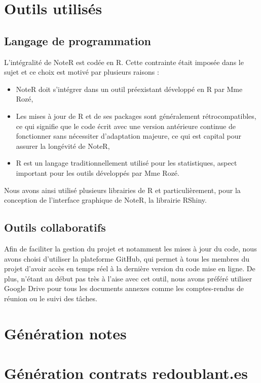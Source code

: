 \documentclass[a4paper,11pt]{article}
\begin{document}
\section{Outils utilisés}
\subsection{Langage de programmation }
    L'intégralité de NoteR est codée en R. Cette contrainte était imposée dans le sujet et ce choix est motivé par plusieurs raisons :
        \begin{itemize}
            \item NoteR doit s'intégrer dans un outil préexistant développé en R par Mme Rozé,
            \item Les mises à jour de R et de ses packages sont généralement rétrocompatibles, ce qui signifie que le code écrit avec une version antérieure continue de fonctionner sans nécessiter d'adaptation majeure, ce qui est capital pour assurer la longévité de NoteR,
            \item  R est un langage traditionnellement utilisé pour les statistiques, aspect important pour les outils développés par Mme Rozé.
        \end{itemize}
        Nous avons ainsi utilisé plusieurs librairies de R et particulièrement, pour la conception de l'interface graphique de NoteR, la librairie RShiny.
\subsection{Outils collaboratifs }
    Afin de faciliter la gestion du projet et notamment les mises à jour du code, nous avons choisi d'utiliser la plateforme GitHub, qui permet à tous les membres du projet d'avoir accès en temps réel à la dernière version du code mise en ligne. De plus, n'étant au début pas très à l'aise avec cet outil, nous avons préféré utiliser Google Drive pour tous les documents annexes comme les comptes-rendus de réunion ou le suivi des tâches.
  
\section{Génération notes }
  

\section{Génération contrats redoublant.es}
  
\end{document}
